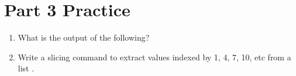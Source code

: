 \documentclass[letterpaper,10pt,english]{sphinxmanual}
\begin{document}
\section{Part 3 Practice}
\label{\detokenize{lecture_notes/lec10_lists2:part-3-practice}}\begin{enumerate}
\item {} 
What is the output of the following?

%
\begin{sphinxVerbatim}[commandchars=\\\{\}]
  \PYG{p}{[}\PYG{p}{]}  \PYG{p}{[}\PYG{p}{]}
  
\PYG{p}{[}\PYG{p}{]}  \PYG{p}{[}\PYG{p}{]}
\PYG{p}{[}\PYG{p}{]}  \PYG{p}{[}\PYG{p}{]}
\PYG{p}{[}\PYG{p}{]}  \PYG{p}{[}\PYG{p}{]}

\end{sphinxVerbatim}

\item {} 
Write a slicing command to extract values indexed
by 1, 4, 7, 10, etc from a list  .

\end{enumerate}
\end{document}
